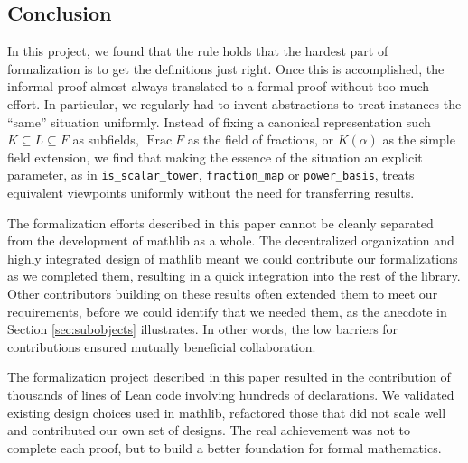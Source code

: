 \documentclass[a4paper,USenglish,cleveref, autoref, thm-restate]{lipics-v2021}
\newcommand{\lean}[1]{\texttt{#1}\xspace} %
\newcommand{\mathlib}{\textsf{mathlib}\xspace}
\DeclareMathOperator{\Frac}{Frac}
\begin{document}
\subsection{Conclusion}

In this project, we found that the rule holds that the hardest part of formalization is to get the definitions just right.
Once this is accomplished, the informal proof almost always translated to a formal proof without too much effort.
In particular, we regularly had to invent abstractions to treat instances the ``same'' situation uniformly.
Instead of fixing a canonical representation such $K \subseteq L \subseteq F$ as subfields, $\Frac F$ as the field of fractions, or $K(\alpha)$ as the simple field extension,
we find that making the essence of the situation an explicit parameter, as in \lean{is\_scalar\_tower}, \lean{fraction\_map} or \lean{power\_basis},
treats equivalent viewpoints uniformly without the need for transferring results.

The formalization efforts described in this paper cannot be cleanly separated from the development of \mathlib as a whole.
The decentralized organization and highly integrated design of \mathlib meant we could contribute our formalizations as we completed them,
resulting in a quick integration into the rest of the library.
Other contributors building on these results often extended them to meet our requirements,
before we could identify that we needed them, as the anecdote in Section \ref{sec:subobjects} illustrates.
In other words, the low barriers for contributions ensured mutually beneficial collaboration.

The formalization project described in this paper resulted in the contribution of thousands of lines of Lean code involving hundreds of declarations.
We validated existing design choices used in \mathlib, refactored those that did not scale well
and contributed our own set of designs.
The real achievement was not to complete each proof,
but to build a better foundation for formal mathematics.



\end{document}
